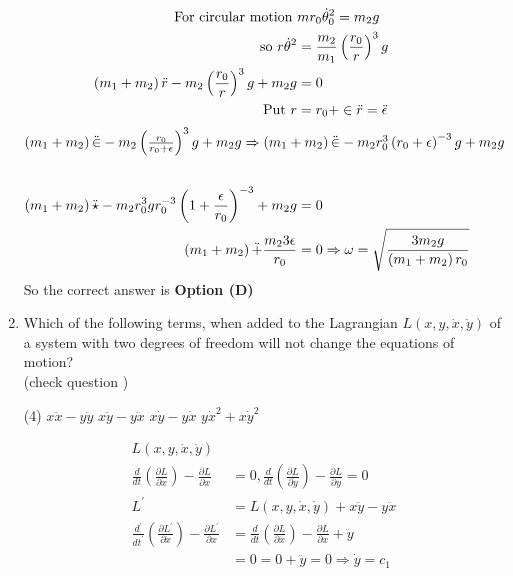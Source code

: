 \begin{enumerate}
\begin{answer}
\begin{align*}
\text{For circular motion }&m r_{0} \dot{\theta}_{0}^{2}=m_{2} g\\
\text{	so }r \dot{\theta}^{2}&=\frac{m_{2}}{m_{1}}\left(\frac{r_{0}}{r}\right)^{3} g\\
\left(m_{1}+m_{2}\right) \ddot{r}-m_{2}\left(\frac{r_{0}}{r}\right)^{3} g+m_{2} g&=0\\
\text{Put }r&=r_{0}+\in \ddot{r}=\ddot{\epsilon}\\
\intertext{$\left(m_{1}+m_{2}\right) \ddot{\in}-m_{2}\left(\frac{r_{0}}{r_{0}+\epsilon}\right)^{3} g+m_{2} g\Rightarrow\left(m_{1}+m_{2}\right) \ddot{\in}-m_{2} r_{0}^{3}\left(r_{0}+\epsilon\right)^{-3} g+m_{2} g$}\\
\left(m_{1}+m_{2}\right) \ddot{\star}-m_{2} r_{0}^{3} g r_{0}^{-3}\left(1+\frac{\epsilon}{r_{0}}\right)^{-3}+m_{2} g&=0\\
\left(m_{1}+m_{2}\right) \ddot+\frac{m_{2} 3 \epsilon}{r_{0}}&=0 \Rightarrow \omega=\sqrt{\frac{3 m_{2} g}{\left(m_{1}+m_{2}\right) r_{0}}}
\end{align*}
So the correct answer is \textbf{Option (D)}
\end{answer}	
\item Which of the following terms, when added to the Lagrangian $L(x, y, \dot{x}, \dot{y})$ of a system with two degrees of freedom will not change the equations of motion?\\
(check question )
{}
\begin{tasks}(4)
\task[\textbf{A.}] $x \ddot{x}-y \ddot{y}$
\task[\textbf{B.}] $x \ddot{y}-y \ddot{x}$
\task[\textbf{C.}] $x \dot{y}-y \dot{x}$
\task[\textbf{D.}] $y \dot{x}^{2}+x \dot{y}^{2}$ 
\end{tasks}
\begin{answer}
\begin{align*}
L(x, y, \dot{x}, \dot{y})\\
\frac{d}{d t}\left(\frac{\partial L}{\partial \dot{x}}\right)-\frac{\partial L}{\partial x}&=0, \frac{d}{d t}\left(\frac{\partial L}{\partial \dot{y}}\right)-\frac{\partial L}{\partial y}=0\\
L^{\prime}&=L(x, y, \dot{x}, \dot{y})+x \ddot{y}-y \ddot{x}\\
\frac{d^{\prime}}{d t^{\prime}}\left(\frac{\partial L^{\prime}}{\partial \dot{x}}\right)-\frac{\partial L^{\prime}}{\partial x}&=\frac{d}{d t}\left(\frac{\partial L}{\partial \dot{x}}\right)-\frac{\partial L}{\partial x}+\ddot{y}\\&=0=0+\ddot{y}=0 \Rightarrow \dot{y}=c_{1}\\

\end{align*}
\end{answer}
\end{enumerate}
